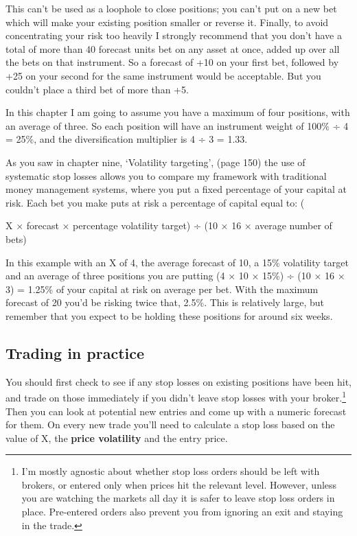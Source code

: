 This can't be used as a loophole to close positions; you can't put on a new bet which will make your existing position smaller or reverse it. Finally, to avoid concentrating your risk too heavily I strongly recommend that you don't have a total of more than 40 forecast units bet on any asset at once, added up over all the bets on that instrument. So a forecast of +10 on your first bet, followed by +25 on your second for the same instrument would be acceptable. But you couldn't place a third bet of more than +5.

In this chapter I am going to assume you have a maximum of four positions, with an average of three. So each position will have an instrument weight of 100\% ÷ 4 = 25\%, and the diversification multiplier is 4 ÷ 3 = 1.33.

As you saw in chapter nine, ‘Volatility targeting', (page 150) the use of systematic stop losses allows you to compare my framework with traditional money management systems, where you put a fixed percentage of your capital at risk. Each bet you make puts at risk a percentage of capital equal to: (

X × forecast × percentage volatility target) ÷ (10 × 16 × average number of bets)

In this example with an X of 4, the average forecast of 10, a 15\% volatility target and an average of three positions you are putting (4 × 10 × 15\%) ÷ (10 × 16 × 3) = 1.25\% of your capital at risk on average per bet. With the maximum forecast of 20 you'd be risking twice that, 2.5\%. This is relatively large, but remember that you expect to be holding these positions for around six weeks.

\subsection*{Trading in practice}

You should first check to see if any stop losses on existing positions have been hit, and trade on those immediately if you didn't leave stop losses with your broker.\footnote{I'm mostly agnostic about whether stop loss orders should be left with brokers, or entered only when prices hit the relevant level. However, unless you are watching the markets all day it is safer to leave stop loss orders in place. Pre-entered orders also prevent you from ignoring an exit and staying in the trade.} Then you can look at potential new entries and come up with a numeric forecast for them. On every new trade you'll need to calculate a stop loss based on the value of X, the \textbf{price volatility} and the entry price.

